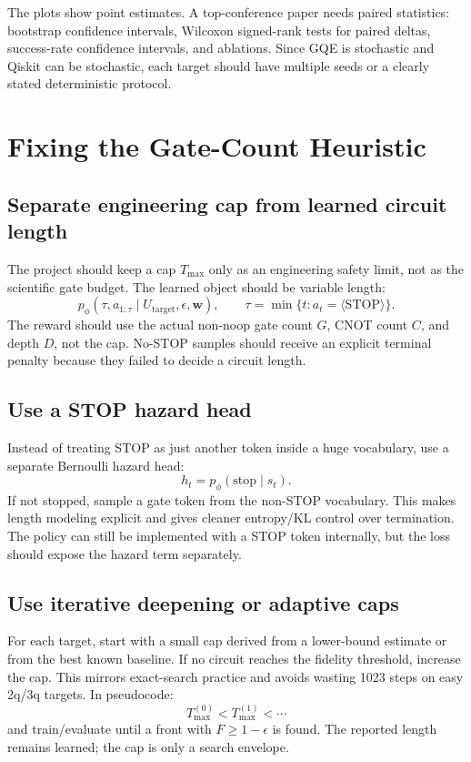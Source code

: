 \documentclass[11pt,a4paper]{article}
\newcommand{\Utarget}{U_{\mathrm{target}}}
\newcommand{\STOP}{\langle \mathrm{STOP}\rangle}
\begin{document}
The plots show point estimates. A top-conference paper needs paired statistics:
bootstrap confidence intervals, Wilcoxon signed-rank tests for paired deltas,
success-rate confidence intervals, and ablations. Since GQE is stochastic and
Qiskit can be stochastic, each target should have multiple seeds or a clearly
stated deterministic protocol.

\section{Fixing the Gate-Count Heuristic}

\subsection{Separate engineering cap from learned circuit length}

The project should keep a cap $T_{\max}$ only as an engineering safety limit,
not as the scientific gate budget. The learned object should be variable length:
\[
  p_\phi(\tau, a_{1:\tau}\mid \Utarget, \epsilon, \bm{w}),
  \qquad
  \tau = \min\{t:a_t=\STOP\}.
\]
The reward should use the actual non-noop gate count $G$, CNOT count $C$, and
depth $D$, not the cap. No-STOP samples should receive an explicit terminal
penalty because they failed to decide a circuit length.

\subsection{Use a STOP hazard head}

Instead of treating STOP as just another token inside a huge vocabulary, use a
separate Bernoulli hazard head:
\[
  h_t = p_\phi(\mathrm{stop}\mid s_t).
\]
If not stopped, sample a gate token from the non-STOP vocabulary. This makes
length modeling explicit and gives cleaner entropy/KL control over termination.
The policy can still be implemented with a STOP token internally, but the loss
should expose the hazard term separately.

\subsection{Use iterative deepening or adaptive caps}

For each target, start with a small cap derived from a lower-bound estimate or
from the best known baseline. If no circuit reaches the fidelity threshold,
increase the cap. This mirrors exact-search practice and avoids wasting 1023
steps on easy 2q/3q targets. In pseudocode:
\[
  T_{\max}^{(0)} < T_{\max}^{(1)} < \cdots
\]
and train/evaluate until a front with $F\ge1-\epsilon$ is found. The reported
length remains learned; the cap is only a search envelope.
\end{document}

